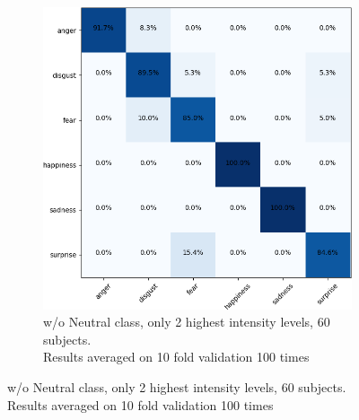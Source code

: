 \begin{figure}[H]
    \centering
    \begin{subfigure}[t]{0.4\textwidth}
        \includegraphics[width=\linewidth]{Images/conf_mat/conf_mat_BU3DFE_6_only_highest.png}
        \caption{w/o Neutral class, 
        only 2 highest intensity levels, 60 subjects. \\ Results averaged on 10 fold validation 100 times}
        \label{conf_mat_BU3DFE_6_only_highest}
        \vspace{0.2cm}
    \end{subfigure}
  

\end{figure}
